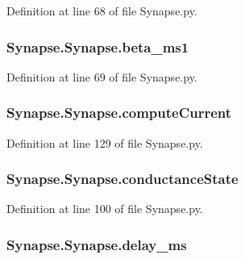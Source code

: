 Definition at line 68 of file Synapse.\-py.

\hypertarget{class_synapse_1_1_synapse_ab59f413cbd21555531be209dee307a97}{
\subsubsection[{beta\-\_\-ms1}]{\setlength{\rightskip}{0pt plus 5cm}Synapse.\-Synapse.\-beta\-\_\-ms1}}\label{class_synapse_1_1_synapse_ab59f413cbd21555531be209dee307a97}


Definition at line 69 of file Synapse.\-py.

\hypertarget{class_synapse_1_1_synapse_a9f68cb297a4bc98c4cb9d5c042b5d0d6}{
\subsubsection[{compute\-Current}]{\setlength{\rightskip}{0pt plus 5cm}Synapse.\-Synapse.\-compute\-Current}}\label{class_synapse_1_1_synapse_a9f68cb297a4bc98c4cb9d5c042b5d0d6}


Definition at line 129 of file Synapse.\-py.

\hypertarget{class_synapse_1_1_synapse_a89d3762daa9c60be63403a5ce9fd9a84}{
\subsubsection[{conductance\-State}]{\setlength{\rightskip}{0pt plus 5cm}Synapse.\-Synapse.\-conductance\-State}}\label{class_synapse_1_1_synapse_a89d3762daa9c60be63403a5ce9fd9a84}


Definition at line 100 of file Synapse.\-py.

\hypertarget{class_synapse_1_1_synapse_a14adfda48133bd314f4dcd65fc9a2366}{
\subsubsection[{delay\-\_\-ms}]{\setlength{\rightskip}{0pt plus 5cm}Synapse.\-Synapse.\-delay\-\_\-ms}}\label{class_synapse_1_1_synapse_a14adfda48133bd314f4dcd65fc9a2366}


